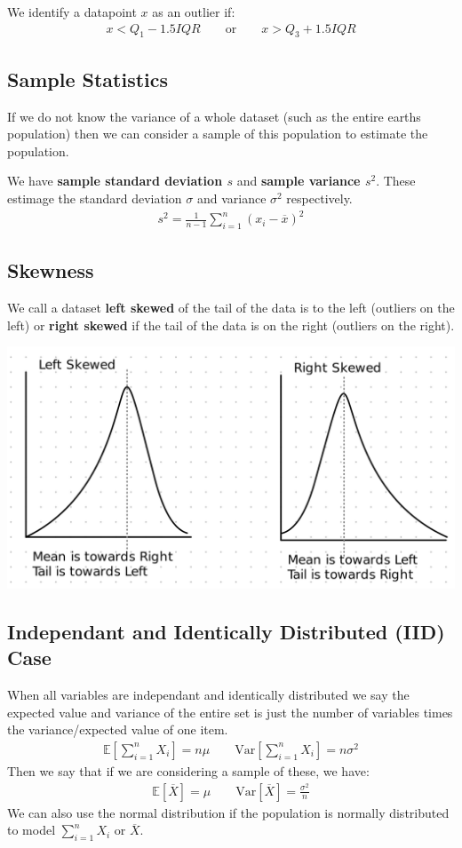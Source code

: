 \documentclass[12pt,letterpaper]{article} \usepackage{amsmath} \usepackage{graphicx} \usepackage[margin=1in]{geometry} \usepackage{longtable}  \usepackage{amssymb}
\begin{document}
	We identify a datapoint $x$ as an outlier if:
	\begin{align*}
		x < Q_1 - 1.5IQR \qquad \text{or} \qquad x>Q_3 + 1.5IQR
	\end{align*}

	\subsection{Sample Statistics}
	If we do not know the variance of a whole dataset (such as the entire earths population) then we can consider a sample of this population to estimate the population. 
	
	We have \textbf{sample standard deviation $s$} and \textbf{sample variance $s^2$}. These estimage the standard deviation $\sigma$ and variance $\sigma^2$ respectively. 
	\begin{align*}
		s^2 = \frac{1}{n-1}\sum^{n}_{i=1}(x_i - \overline x)^2
	\end{align*}

	\subsection{Skewness}
	We call a dataset \textbf{left skewed} of the tail of the data is to the left (outliers on the left) or \textbf{right skewed} if the tail of the data is on the right (outliers on the right).
	\begin{center}
		\includegraphics[width=0.6\linewidth]{skew}
	\end{center}

	\subsection{Independant and Identically Distributed (IID) Case}
	When all variables are independant and identically distributed we say the expected value and variance of the entire set is just the number of variables times the variance/expected value of one item.
	\begin{align*}
		\mathbb E\left[\sum_{i=1}^{n}X_i\right]=n\mu \qquad \text{Var}\left[\sum_{i=1}^{n}X_i\right]=n\sigma^2
	\end{align*}
	Then we say that if we are considering a sample of these, we have:
	\begin{align*}
		\mathbb E [\overline X] = \mu \qquad \text{Var} [\overline X] = \frac{\sigma^2}{n}
	\end{align*}
	We can also use the normal distribution if the population is normally distributed to model $\sum_{i=1}^n X_i$ or $\overline X$.
	
\end{document}
